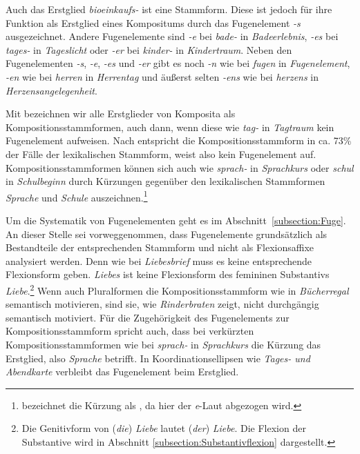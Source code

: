 Auch das Erstglied \textit{bioeinkaufs-} ist eine Stammform. Diese ist jedoch für ihre Funktion als Erstglied eines Kompositums durch das Fugenelement \textit{-s} ausgezeichnet. Andere Fugenelemente sind \textit{-e} bei \textit{bade-} in \textit{Badeerlebnis}, \textit{-es} bei \textit{tages-} in \textit{Tageslicht} oder \textit{-er} bei \textit{kinder-} in \textit{Kindertraum}. Neben den Fugenelementen \textit{-s}, \textit{-e}, \textit{-es} und \textit{-er} gibt es noch \textit{-n} wie bei \textit{fugen} in \textit{Fugenelement}, \textit{-en} wie bei \textit{herren} in \textit{Herrentag} und äußerst selten \textit{-ens} wie bei \textit{herzens} in \textit{Herzensangelegenheit}.  

Mit \citet[96]{Wurzel1970} bezeichnen wir alle Erstglieder von Komposita als Kompositionsstammformen, auch dann, wenn diese wie \textit{tag-} in \textit{Tagtraum} kein Fugenelement aufweisen. Nach \citet[54]{Ortner_Komposita1991} entspricht die Kompositionsstammform in ca. 73\% der Fälle der lexikalischen Stammform, weist also kein Fugenelement auf. Kompositionsstammformen können sich auch wie \textit{sprach-} in \textit{Sprachkurs} oder \textit{schul} in \textit{Schulbeginn} durch Kürzungen gegenüber den lexikalischen Stammformen \textit{Sprache} und \textit{Schule} auszeichnen.\footnote{\citet[247]{Eisenberg2020_Wort} bezeichnet die Kürzung als , da hier der \textit{e}-Laut abgezogen wird.}

Um die Systematik von Fugenelementen geht es im Abschnitt~\ref{subsection:Fuge}. An dieser Stelle sei vorweggenommen, dass Fugenelemente grundsätzlich als Bestandteile der entsprechenden Stammform und nicht als Flexionsaffixe analysiert werden. Denn wie bei \textit{Liebesbrief} muss es keine entsprechende Flexionsform geben. \textit{Liebes} ist keine Flexionsform des femininen Substantivs \textit{Liebe}.\footnote{Die Genitivform von (\textit{die}) \textit{Liebe} lautet (\textit{der}) \textit{Liebe}. Die Flexion der Substantive wird in Abschnitt \ref{subsection:Substantivflexion} dargestellt.} Wenn auch Pluralformen die Kompositionsstammform wie in \textit{Bücherregal} semantisch motivieren, sind sie, wie \textit{Rinderbraten} zeigt, nicht durchgängig semantisch motiviert. Für die Zugehörigkeit des Fugenelements zur Kompositionsstammform spricht auch, dass bei verkürzten Kompositionsstammformen wie bei \textit{sprach-} in \textit{Sprachkurs} die Kürzung das Erstglied, also \textit{Sprache} betrifft. In Koordinationsellipsen wie \textit{Tages- und Abendkarte} verbleibt das Fugenelement beim Erstglied.

